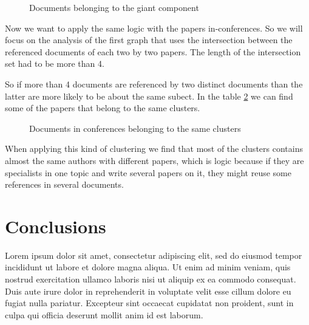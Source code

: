 \documentclass[journal,twocolumn]{IEEEtran}
\begin{document}
    \begin{figure}
        \begin{center}\end{center}
        \caption{Documents belonging to the giant component}
        \label{fig10}
    \end{figure}
    
    Now we want to apply the same logic with the papers in-conferences. So
we will focus on the analysis of the first graph that uses the
intersection between the referenced documents of each two by two papers.
The length of the intersection set had to be more than 4.

So if more than 4 documents are referenced by two distinct documents
than the latter are more likely to be about the same subect. In the
table \ref{fig11} we can find some of the papers that belong to the same
clusters.


    \begin{figure}
        \begin{center}\end{center}
        \caption{Documents in conferences belonging to the same clusters}
        \label{fig11}
    \end{figure}
    
    When applying this kind of clustering we find that most of the clusters
contains almost the same authors with different papers, which is logic
because if they are specialists in one topic and write several papers on
it, they might reuse some references in several documents.

    \hypertarget{conclusions}{%
\section{Conclusions}\label{conclusions}}

Lorem ipsum dolor sit amet, consectetur adipiscing elit, sed do eiusmod
tempor incididunt ut labore et dolore magna aliqua. Ut enim ad minim
veniam, quis nostrud exercitation ullamco laboris nisi ut aliquip ex ea
commodo consequat. Duis aute irure dolor in reprehenderit in voluptate
velit esse cillum dolore eu fugiat nulla pariatur. Excepteur sint
occaecat cupidatat non proident, sunt in culpa qui officia deserunt
mollit anim id est laborum.
\newpage

    
    



    
    
\end{document}
